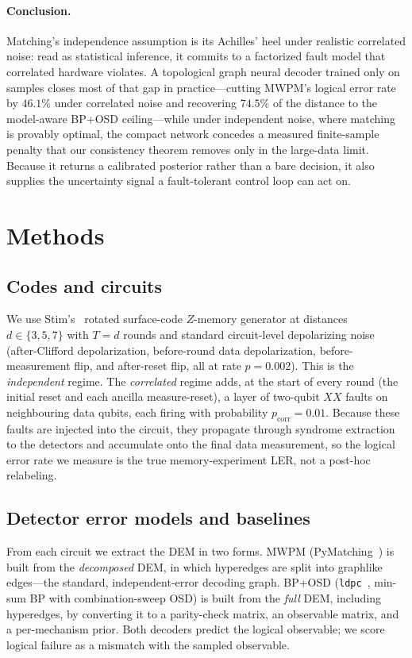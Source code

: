 \documentclass[aps,prxquantum,twocolumn,superscriptaddress,nofootinbib,longbibliography]{revtex4-2}
\newcommand{\res}[1]{#1}
\begin{document}
\paragraph{Conclusion.}
Matching's independence assumption is its Achilles' heel under realistic
correlated noise: read as statistical inference, it commits to a factorized
fault model that correlated hardware violates. A topological graph neural decoder
trained only on samples closes most of that gap in practice---cutting MWPM's
logical error rate by $\res{46.1}\%$ under correlated noise and recovering
$\res{74.5}\%$ of the distance to the model-aware BP+OSD ceiling---while under
independent noise, where matching is provably optimal, the compact network
concedes a measured finite-sample penalty that our consistency theorem removes
only in the large-data limit. Because it returns a calibrated posterior rather
than a bare decision, it also supplies the uncertainty signal a fault-tolerant
control loop can act on.

\section{Methods}
\label{sec:methods}

\subsection{Codes and circuits}
We use Stim's~\cite{gidney2021stim} rotated surface-code $Z$-memory generator at
distances $d\in\{3,5,7\}$ with $T=d$ rounds and standard circuit-level
depolarizing noise (after-Clifford depolarization, before-round data
depolarization, before-measurement flip, and after-reset flip, all at rate
$p=0.002$). This is the \emph{independent} regime. The \emph{correlated} regime
adds, at the start of every round (the initial reset and each ancilla
measure-reset), a layer of two-qubit $XX$ faults on neighbouring data qubits,
each firing with probability $p_{\mathrm{corr}}=0.01$. Because these faults
are injected into the circuit, they propagate through syndrome extraction to the
detectors and accumulate onto the final data measurement, so the logical error
rate we measure is the true memory-experiment LER, not a post-hoc relabeling.

\subsection{Detector error models and baselines}
From each circuit we extract the DEM in two forms. MWPM
(PyMatching~\cite{higgott2022pymatching}) is built from the \emph{decomposed}
DEM, in which hyperedges are split into graphlike edges---the standard,
independent-error decoding graph. BP+OSD (\texttt{ldpc}~\cite{roffe2020decoding},
min-sum BP with combination-sweep OSD) is built from the \emph{full} DEM,
including hyperedges, by converting it to a parity-check matrix, an
observable matrix, and a per-mechanism prior. Both decoders predict the logical
observable; we score logical failure as a mismatch with the sampled observable.
\end{document}
